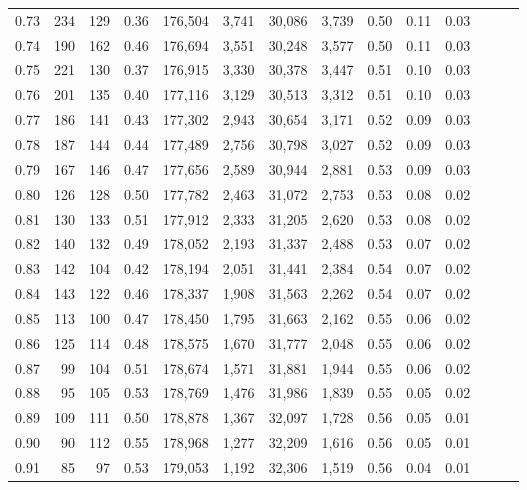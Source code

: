 \begin{tabular}{rrrrrrrrrrrrrr}
0.73 &    234 &  129 &  0.36 &  176,504 &    3,741 &  30,086 &   3,739 &  0.50 &  0.11 &      0.03 \\
0.74 &    190 &  162 &  0.46 &  176,694 &    3,551 &  30,248 &   3,577 &  0.50 &  0.11 &      0.03 \\
0.75 &    221 &  130 &  0.37 &  176,915 &    3,330 &  30,378 &   3,447 &  0.51 &  0.10 &      0.03 \\
0.76 &    201 &  135 &  0.40 &  177,116 &    3,129 &  30,513 &   3,312 &  0.51 &  0.10 &      0.03 \\
0.77 &    186 &  141 &  0.43 &  177,302 &    2,943 &  30,654 &   3,171 &  0.52 &  0.09 &      0.03 \\
0.78 &    187 &  144 &  0.44 &  177,489 &    2,756 &  30,798 &   3,027 &  0.52 &  0.09 &      0.03 \\
0.79 &    167 &  146 &  0.47 &  177,656 &    2,589 &  30,944 &   2,881 &  0.53 &  0.09 &      0.03 \\
0.80 &    126 &  128 &  0.50 &  177,782 &    2,463 &  31,072 &   2,753 &  0.53 &  0.08 &      0.02 \\
0.81 &    130 &  133 &  0.51 &  177,912 &    2,333 &  31,205 &   2,620 &  0.53 &  0.08 &      0.02 \\
0.82 &    140 &  132 &  0.49 &  178,052 &    2,193 &  31,337 &   2,488 &  0.53 &  0.07 &      0.02 \\
0.83 &    142 &  104 &  0.42 &  178,194 &    2,051 &  31,441 &   2,384 &  0.54 &  0.07 &      0.02 \\
0.84 &    143 &  122 &  0.46 &  178,337 &    1,908 &  31,563 &   2,262 &  0.54 &  0.07 &      0.02 \\
0.85 &    113 &  100 &  0.47 &  178,450 &    1,795 &  31,663 &   2,162 &  0.55 &  0.06 &      0.02 \\
0.86 &    125 &  114 &  0.48 &  178,575 &    1,670 &  31,777 &   2,048 &  0.55 &  0.06 &      0.02 \\
0.87 &     99 &  104 &  0.51 &  178,674 &    1,571 &  31,881 &   1,944 &  0.55 &  0.06 &      0.02 \\
0.88 &     95 &  105 &  0.53 &  178,769 &    1,476 &  31,986 &   1,839 &  0.55 &  0.05 &      0.02 \\
0.89 &    109 &  111 &  0.50 &  178,878 &    1,367 &  32,097 &   1,728 &  0.56 &  0.05 &      0.01 \\
0.90 &     90 &  112 &  0.55 &  178,968 &    1,277 &  32,209 &   1,616 &  0.56 &  0.05 &      0.01 \\
0.91 &     85 &   97 &  0.53 &  179,053 &    1,192 &  32,306 &   1,519 &  0.56 &  0.04 &      0.01 \\

\end{tabular}
